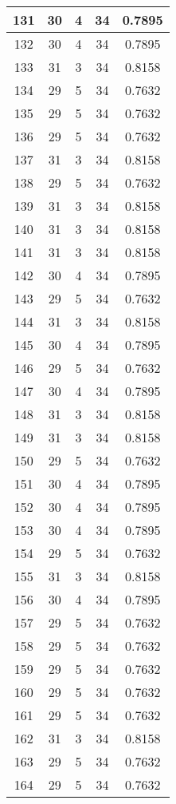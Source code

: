\documentclass[letterpaper, 12pt]{article}
\begin{document}
\begin{longtable}{|c|c|c|c|c|}
\hline
131 & 30 & 4 & 34 & 0.7895 \\
\hline
132 & 30 & 4 & 34 & 0.7895 \\
\hline
133 & 31 & 3 & 34 & 0.8158 \\
\hline
134 & 29 & 5 & 34 & 0.7632 \\
\hline
135 & 29 & 5 & 34 & 0.7632 \\
\hline
136 & 29 & 5 & 34 & 0.7632 \\
\hline
137 & 31 & 3 & 34 & 0.8158 \\
\hline
138 & 29 & 5 & 34 & 0.7632 \\
\hline
139 & 31 & 3 & 34 & 0.8158 \\
\hline
140 & 31 & 3 & 34 & 0.8158 \\
\hline
141 & 31 & 3 & 34 & 0.8158 \\
\hline
142 & 30 & 4 & 34 & 0.7895 \\
\hline
143 & 29 & 5 & 34 & 0.7632 \\
\hline
144 & 31 & 3 & 34 & 0.8158 \\
\hline
145 & 30 & 4 & 34 & 0.7895 \\
\hline
146 & 29 & 5 & 34 & 0.7632 \\
\hline
147 & 30 & 4 & 34 & 0.7895 \\
\hline
148 & 31 & 3 & 34 & 0.8158 \\
\hline
149 & 31 & 3 & 34 & 0.8158 \\
\hline
150 & 29 & 5 & 34 & 0.7632 \\
\hline
151 & 30 & 4 & 34 & 0.7895 \\
\hline
152 & 30 & 4 & 34 & 0.7895 \\
\hline
153 & 30 & 4 & 34 & 0.7895 \\
\hline
154 & 29 & 5 & 34 & 0.7632 \\
\hline
155 & 31 & 3 & 34 & 0.8158 \\
\hline
156 & 30 & 4 & 34 & 0.7895 \\
\hline
157 & 29 & 5 & 34 & 0.7632 \\
\hline
158 & 29 & 5 & 34 & 0.7632 \\
\hline
159 & 29 & 5 & 34 & 0.7632 \\
\hline
160 & 29 & 5 & 34 & 0.7632 \\
\hline
161 & 29 & 5 & 34 & 0.7632 \\
\hline
162 & 31 & 3 & 34 & 0.8158 \\
\hline
163 & 29 & 5 & 34 & 0.7632 \\
\hline
164 & 29 & 5 & 34 & 0.7632 \\

\end{longtable}
\end{document}

